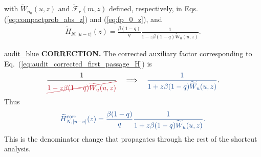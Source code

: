 \documentclass[10pt, hidelinks, superscriptaddress, amsmath, amssymb, aps, pre]{revtex4-2}
\newcommand{\auditlabel}[1]{\textbf{\textcolor{audit_blue}{#1}}}
\newcommand{\auditcorrected}[1]{\textcolor{audit_blue}{#1}}
\newcommand{\auditmathwrong}[1]{\textcolor{bright_red}{\cancel{#1}}}
\newcommand{\auditarrow}{\quad\Longrightarrow\quad}
\begin{document}
with $\widetilde{W}_{n_0}(u,z)$ and $\widetilde{\mathcal{F}}_{r}(m,z)$ defined, respectively, in Eqs. (\ref{eq:compactprob_abs_z}) and (\ref{eq:fp_0_z}), and
 \begin{align}
  \widetilde{H}_{N,|u-v|}(z)=\frac{\beta(1-q)}{q}\frac{1}{1-z\beta(1-q)\widetilde{W}_{u}(u,z)}.
\label{eq:HNuv}
\end{align}
\begin{auditbox}{audit_blue}
\auditlabel{CORRECTION.}  The corrected auxiliary factor corresponding to
Eq.~(\ref{eq:audit_corrected_first_passage_H}) is
\begin{align}
\frac{1}{\auditmathwrong{1-z\beta(1-q)\widetilde W_u(u,z)}}
\auditarrow
\auditcorrected{
\frac{1}{1+z\beta(1-q)\widetilde W_u(u,z)}} .
\label{eq:audit_redline_H_denominator}
\end{align}
Thus
\begin{align}
\auditcorrected{
\widetilde{H}^{\rm corr}_{N,|u-v|}(z)
=\frac{\beta(1-q)}{q}
\frac{1}{1+z\beta(1-q)\widetilde W_u(u,z)}.}
\label{eq:audit_corrected_HNuv}
\end{align}
This is the denominator change that propagates through the rest of the
shortcut analysis.
\end{auditbox}
\end{document}
